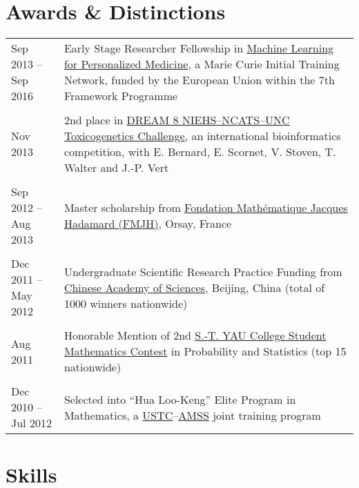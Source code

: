 \documentclass[10pt,a4paper]{article}
\begin{document}
\section*{Awards \& Distinctions}

\begin{center}
\small
\begin{tabularx}{\textwidth}{p{3cm}|X}

\hfill
Sep 2013 -- Sep 2016 & Early Stage Researcher Fellowship in \href{http://www.mlpm.eu}{Machine Learning for Personalized Medicine}, a Marie Curie Initial Training Network, funded by the European Union within the 7th Framework Programme\\\\

\hfill
Nov 2013 & 2nd place in \href{http://dreamchallenges.org/project/closed/dream-8-niehs-ncats-unc-dream-toxicogenetics-challenge/}{DREAM 8 NIEHS--NCATS--UNC Toxicogenetics Challenge}, an international
bioinformatics competition, with E. Bernard, E. Scornet, V. Stoven, T. Walter and J.-P. Vert\\\\

\hfill
Sep 2012 -- Aug 2013 & Master scholarship from \href{http://www.fondation-hadamard.fr}{Fondation Math\'{e}matique Jacques Hadamard (FMJH)}, Orsay, France\\\\

\hfill 
Dec 2011 -- May 2012 & Undergraduate Scientific Research Practice Funding from \href{http://www.cas.cn}{Chinese Academy of Sciences}, Beijing, China (total of 1000 winners nationwide)\\\\

\hfill 
Aug 2011 & Honorable Mention of 2nd \href{http://www.cms.zju.edu.cn/conference/ycmc/rules.html}{S.-T. YAU College Student Mathematics Contest} in Probability and Statistics (top 15 nationwide)\\\\

\hfill 
Dec 2010 -- Jul 2012 & Selected into ``Hua Loo-Keng'' Elite Program in Mathematics, a \href{http://www.ustc.edu.cn}{USTC}--\href{http://www.amss.cas.cn}{AMSS} joint training program
\end{tabularx}
\end{center}

\section*{Skills}
\end{document}
